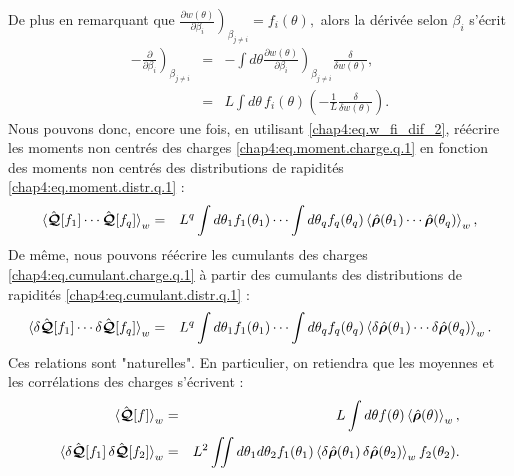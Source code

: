 De plus en remarquant que
\(
	\left. \frac{ \partial w (\theta) }{ \partial \beta_i } \right)_{\beta_{j\neq i}} = f_i(\theta) ,
\)
alors la dérivée selon $\beta_i$ s'écrit
\begin{eqnarray}\label{chap4:eq.w_fi_dif_2}
	-\left. \frac{ \partial}{ \partial \beta_i } \right)_{\beta_{j\neq i}} & = & - \int d \theta  \left. \frac{ \partial w (\theta) }{ \partial \beta_i } \right)_{\beta_{j\neq i}} \frac{\delta}{\delta w(\theta)} \nonumber ,\\
	& = & L \int d\theta \, f_i(\theta) \left ( - \frac{1}{L} 	\frac{\delta}{\delta w(\theta)} \right ) \label{chap4:eq.moment.charge.q.2}.
\end{eqnarray}
Nous pouvons donc, encore une fois, en utilisant \eqref{chap4:eq.w_fi_dif_2}, réécrire les moments non centrés des charges \eqref{chap4:eq.moment.charge.q.1} en fonction des moments non centrés des distributions de rapidités \eqref{chap4:eq.moment.distr.q.1} :
\begin{eqnarray}
	\braket{\hat{\bm{\mathcal{Q}}}[f_1] \cdots \hat{\bm{\mathcal{Q}}}[f_q]}_w  & = & L^q \int d\theta_1 f_1(\theta_1)  \cdots  \int d\theta_q f_q(\theta_q)  \braket{\hat{\bm{\rho}}(\theta_1)\cdots \hat{\bm{\rho}}(\theta_q)}_w,
\end{eqnarray}
De même, nous pouvons réécrire les cumulants des charges \eqref{chap4:eq.cumulant.charge.q.1} à partir des cumulants des distributions de rapidités \eqref{chap4:eq.cumulant.distr.q.1} :
\begin{eqnarray}
	\braket{\delta\hat{\bm{\mathcal{Q}}}[f_1] \cdots \delta\hat{\bm{\mathcal{Q}}}[f_q]}_w  & = & L^q \int d\theta_1 f_1(\theta_1)  \cdots  \int d\theta_q f_q(\theta_q)  \braket{\delta\hat{\bm{\rho}}(\theta_1)\cdots \delta\hat{\bm{\rho}}(\theta_q)}_w.
\end{eqnarray}
Ces relations sont "naturelles". En particulier, on retiendra que les moyennes et les corrélations des charges s’écrivent :
\begin{eqnarray}
	\braket{\hat{\bm{\mathcal{Q}}}[f] }_w  & = & L \int d\theta f(\theta)  \braket{\hat{\bm{\rho}}(\theta)}_w,\label{chap4:eq.moment.distr.q.10}\\
	\braket{\delta\hat{\bm{\mathcal{Q}}}[f_1] \, \delta\hat{\bm{\mathcal{Q}}}[f_2]}_w  & = & L^2 \iint d\theta_1 d\theta_2 f_1(\theta_1) \braket{\delta\hat{\bm{\rho}}(\theta_1)\, \delta\hat{\bm{\rho}}(\theta_2)}_w  f_2(\theta_2) \label{chap4:eq.cumulant.distr.q.10} .
\end{eqnarray}



